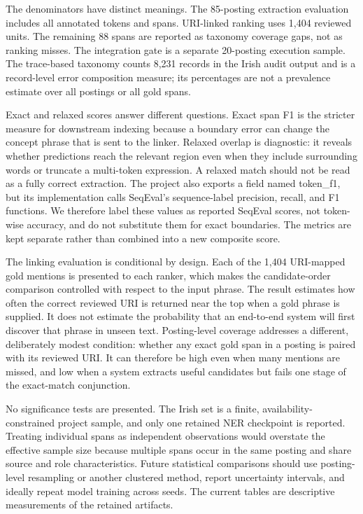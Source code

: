 \documentclass[conference]{IEEEtran}
\begin{document}
The denominators have distinct meanings. The 85-posting extraction evaluation includes all annotated tokens and spans. URI-linked ranking uses 1,404 reviewed units. The remaining 88 spans are reported as taxonomy coverage gaps, not as ranking misses. The integration gate is a separate 20-posting execution sample. The trace-based taxonomy counts 8,231 records in the Irish audit output and is a record-level error composition measure; its percentages are not a prevalence estimate over all postings or all gold spans.

Exact and relaxed scores answer different questions. Exact span F1 is the stricter measure for downstream indexing because a boundary error can change the concept phrase that is sent to the linker. Relaxed overlap is diagnostic: it reveals whether predictions reach the relevant region even when they include surrounding words or truncate a multi-token expression. A relaxed match should not be read as a fully correct extraction. The project also exports a field named \textsf{token\_f1}, but its implementation calls SeqEval's sequence-label precision, recall, and F1 functions. We therefore label these values as reported SeqEval scores, not token-wise accuracy, and do not substitute them for exact boundaries. The metrics are kept separate rather than combined into a new composite score.

The linking evaluation is conditional by design. Each of the 1,404 URI-mapped gold mentions is presented to each ranker, which makes the candidate-order comparison controlled with respect to the input phrase. The result estimates how often the correct reviewed URI is returned near the top when a gold phrase is supplied. It does not estimate the probability that an end-to-end system will first discover that phrase in unseen text. Posting-level coverage addresses a different, deliberately modest condition: whether any exact gold span in a posting is paired with its reviewed URI. It can therefore be high even when many mentions are missed, and low when a system extracts useful candidates but fails one stage of the exact-match conjunction.

No significance tests are presented. The Irish set is a finite, availability-constrained project sample, and only one retained NER checkpoint is reported. Treating individual spans as independent observations would overstate the effective sample size because multiple spans occur in the same posting and share source and role characteristics. Future statistical comparisons should use posting-level resampling or another clustered method, report uncertainty intervals, and ideally repeat model training across seeds. The current tables are descriptive measurements of the retained artifacts.
\end{document}
